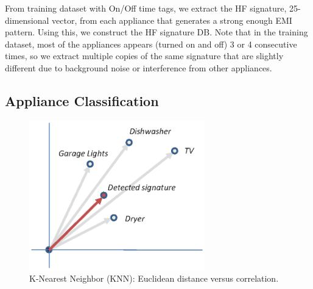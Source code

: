 \documentclass[11pt, letterpaper]{article}
\begin{document}
From training dataset with On/Off time tags, we extract the HF signature, 25-dimensional vector, from each appliance that generates a strong enough EMI pattern. Using this, we construct the HF signature DB. Note that in the training dataset, most of the appliances appears (turned on and off) 3 or 4 consecutive times, so we extract multiple copies of the same signature that are slightly different due to background noise or interference from other appliances.

\subsection{Appliance Classification}
\begin{figure}
\begin{center}
\includegraphics[width=3.0in]{dist_vs_corr.eps}
  \caption{K-Nearest Neighbor (KNN): Euclidean distance versus correlation.}
  \label{fig:dist_vs_corr}
\end{center}
\end{figure}
\end{document}
